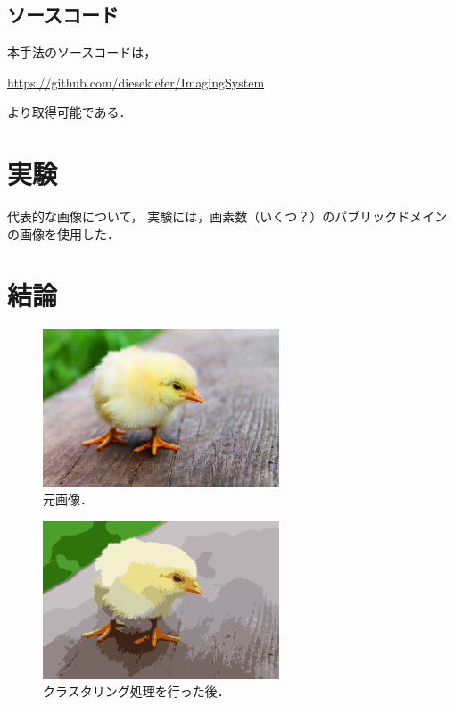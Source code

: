 \documentclass[dvipdfmx]{jsarticle}
\begin{document}

\subsection{ソースコード}

本手法のソースコードは，

\noindent\url{https://github.com/diesekiefer/ImagingSystem}

\noindent より取得可能である．


\section{実験}
代表的な画像について，
実験には，画素数（いくつ？）のパブリックドメインの画像を使用した．

\section{結論}


\begin{figure}[t]
\centering
\includegraphics[width=70mm]{hiyoko_PD.png}
\caption{\quad 元画像．}
\label{fig:original}
\end{figure}
\begin{figure}[t]
\centering
\includegraphics[width=70mm]{hiyoko_16_k-shift.png}
\caption{\quad クラスタリング処理を行った後．}
\label{fig:original}
\end{figure}

%
%
\end{document}
